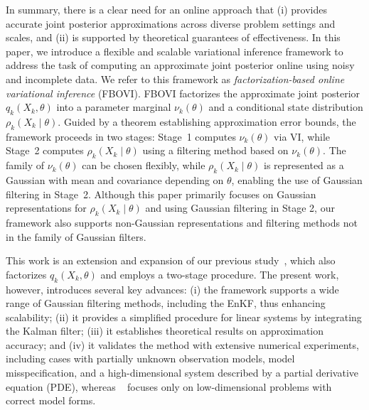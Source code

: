 \documentclass[preprint,3p,times]{elsarticle}
\begin{document}
In summary, there is a clear need for an online approach that (i) provides accurate joint posterior approximations across diverse problem settings and scales, and (ii) is supported by theoretical guarantees of effectiveness. In this paper, we introduce a flexible and scalable variational inference framework to address the task of computing an approximate joint posterior online using noisy and incomplete data. We refer to this framework as \textit{factorization-based online variational inference} (FBOVI). FBOVI factorizes the approximate joint posterior $q_k(X_k,\theta)$ into a parameter marginal $\nu_k(\theta)$ and a conditional state distribution $\rho_k(X_k \mid \theta)$. Guided by a theorem establishing approximation error bounds, the framework proceeds in two stages: Stage~1 computes $\nu_k(\theta)$ via VI, while Stage~2 computes $\rho_k(X_k \mid \theta)$ using a filtering method based on $\nu_k(\theta)$. The family of $\nu_k(\theta)$ can be chosen flexibly, while $\rho_k(X_k \mid \theta)$ is represented as a Gaussian with mean and covariance depending on $\theta$, enabling the use of Gaussian filtering in Stage~2. Although this paper primarily focuses on Gaussian representations for $\rho_k(X_k \mid \theta)$ and using Gaussian filtering in Stage 2, our framework also supports non-Gaussian representations and filtering methods not in the family of Gaussian filters.

This work is an extension and expansion of our previous study~\cite{fbovi}, which also factorizes $q_k(X_k,\theta)$ and employs a two-stage procedure. The present work, however, introduces several key advances: (i) the framework supports a wide range of Gaussian filtering methods, including the EnKF, thus enhancing scalability; (ii) it provides a simplified procedure for linear systems by integrating the Kalman filter; (iii) it establishes theoretical results on approximation accuracy; and (iv) it validates the method with extensive numerical experiments, including cases with partially unknown observation models, model misspecification, and a high-dimensional system described by a partial derivative equation (PDE), whereas ~\cite{fbovi} focuses only on low-dimensional problems with correct model forms. 
\end{document}
